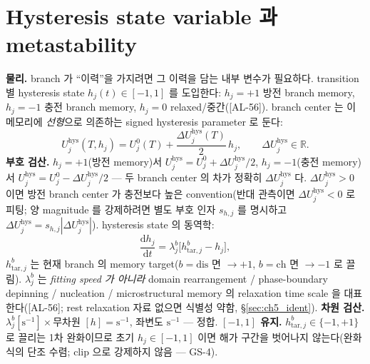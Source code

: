 \documentclass[11pt,a4paper]{article}
\newcommand{\dd}{\mathrm{d}}
\newcommand{\dis}{\mathrm{dis}}
\newcommand{\chg}{\mathrm{ch}}
\newcommand{\hys}{\mathrm{hys}}
\newcommand{\tar}{\mathrm{tar}}
\newcommand{\AL}[1]{\textsf{[AL-#1]}}
\begin{document}
\section{Hysteresis state variable 과 metastability}\label{sec:ch5_hstate}
\textbf{물리.} branch 가 ``이력''을 가지려면 그 이력을 담는 내부 변수가 필요하다. transition 별 hysteresis state
$h_j(t)\in[-1,1]$ 를 도입한다: $h_j=+1$ 방전 branch memory, $h_j=-1$ 충전 branch memory, $h_j=0$
relaxed/중간(\AL{56}). branch center 는 이 메모리에 \emph{선형}으로 의존하는 signed hysteresis parameter 로
둔다:
\begin{equation}
U_j^\hys(T,h_j)=U_j^0(T)+\frac{\Delta U_j^\hys(T)}{2}\,h_j,\qquad \Delta U_j^\hys\in\mathbb R.
\label{eq:ch5_hys_center}
\end{equation}
\textbf{부호 검산.} $h_j=+1$(방전 memory)서 $U_j^\hys=U_j^0+\Delta U_j^\hys/2$, $h_j=-1$(충전 memory)서
$U_j^\hys=U_j^0-\Delta U_j^\hys/2$ — 두 branch center 의 차가 정확히 $\Delta U_j^\hys$ 다.
$\Delta U_j^\hys>0$ 이면 방전 branch center 가 충전보다 높은 convention(반대 관측이면 $\Delta U_j^\hys<0$ 로
피팅; 양 magnitude 를 강제하려면 별도 부호 인자 $s_{h,j}$ 를 명시하고 $\Delta U_j^\hys=s_{h,j}|\Delta U_j^\hys|$).
hysteresis state 의 동역학:
\begin{equation}
\frac{\dd h_j}{\dd t}=\lambda_j^b\big[h_{\tar,j}^b-h_j\big],
\label{eq:ch5_h_dyn}
\end{equation}
$h_{\tar,j}^b$ 는 현재 branch 의 memory target($b=\dis$ 면 $\to+1$, $b=\chg$ 면 $\to-1$ 로 끌림). $\lambda_j^b$
는 \emph{fitting speed 가 아니라} domain rearrangement / phase-boundary depinning / nucleation /
microstructural memory 의 relaxation time scale 을 대표한다(\AL{56}; rest relaxation 자료 없으면 식별성 약함,
\S\ref{sec:ch5_ident}). \textbf{차원 검산.} $\lambda_j^b[\mathrm{s^{-1}}]\times$무차원 $[h]=\mathrm{s^{-1}}$,
좌변도 $\mathrm{s^{-1}}$ — 정합. \textbf{$[-1,1]$ 유지.} $h_{\tar,j}^b\in\{-1,+1\}$ 로 끌리는 1차 완화이므로
초기 $h_j\in[-1,1]$ 이면 해가 구간을 벗어나지 않는다(완화식의 단조 수렴; clip 으로 강제하지 않음 — GS-4).

\end{document}
